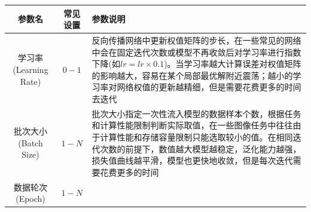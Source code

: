 \begin{longtable}[]{@{}ccl@{}}
\toprule
\begin{minipage}[b]{0.09\columnwidth}\centering\strut
参数名\strut
\end{minipage} & \begin{minipage}[b]{0.10\columnwidth}\centering\strut
常见设置\strut
\end{minipage} & \begin{minipage}[b]{0.08\columnwidth}\raggedright\strut
参数说明\strut
\end{minipage}\tabularnewline
\midrule
\endhead
\begin{minipage}[t]{0.09\columnwidth}\centering\strut
学习率(Learning Rate)\strut
\end{minipage} & \begin{minipage}[t]{0.10\columnwidth}\centering\strut
\(0-1\)\strut
\end{minipage} & \begin{minipage}[t]{0.08\columnwidth}\raggedright\strut
反向传播网络中更新权值矩阵的步长，在一些常见的网络中会在固定迭代次数或模型不再收敛后对学习率进行指数下降(如\(lr=lr\times 0.1\))。当学习率越大计算误差对权值矩阵的影响越大，容易在某个局部最优解附近震荡；越小的学习率对网络权值的更新越精细，但是需要花费更多的时间去迭代\strut
\end{minipage}\tabularnewline
\begin{minipage}[t]{0.09\columnwidth}\centering\strut
批次大小(Batch Size)\strut
\end{minipage} & \begin{minipage}[t]{0.10\columnwidth}\centering\strut
\(1-N\)\strut
\end{minipage} & \begin{minipage}[t]{0.08\columnwidth}\raggedright\strut
批次大小指定一次性流入模型的数据样本个数，根据任务和计算性能限制判断实际取值，在一些图像任务中往往由于计算性能和存储容量限制只能选取较小的值。在相同迭代次数的前提下，数值越大模型越稳定，泛化能力越强，损失值曲线越平滑，模型也更快地收敛，但是每次迭代需要花费更多的时间\strut
\end{minipage}\tabularnewline
\begin{minipage}[t]{0.09\columnwidth}\centering\strut
数据轮次(Epoch)\strut
\end{minipage} & \begin{minipage}[t]{0.10\columnwidth}\centering\strut
\(1-N\)\strut
\end{minipage} & \begin{minipage}[t]{0.08\columnwidth}\raggedright\strut

\end{minipage}
\end{longtable}
